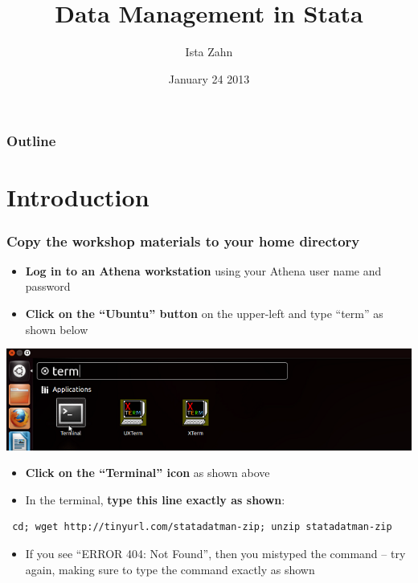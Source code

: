 \documentclass[table]{beamer}
\institute{IQSS}
\title{Data Management in Stata}
\author{Ista Zahn}
\date{January 24 2013}
\begin{document}
\maketitle

\begin{frame}
\frametitle{Outline}
\setcounter{tocdepth}{3}
\tableofcontents
\end{frame}







\section{Introduction}
\label{sec-1}

\begin{frame}[fragile]
\frametitle{Copy the workshop materials to your home directory}
\label{sec-1-1}


\begin{itemize}
\item \textbf{Log in to an Athena workstation} using your Athena user name and password
\item \textbf{Click on the ``Ubuntu'' button} on the upper-left and type ``term'' as shown below
\end{itemize}
\includegraphics[width=.8\textwidth]{./images/OpenTerminal.png}

\begin{itemize}
\item \textbf{Click on the ``Terminal'' icon} as shown above
\item In the terminal, \textbf{type this line exactly as shown}:
\end{itemize}
{\footnotesize
\begin{verbatim}
 cd; wget http://tinyurl.com/statadatman-zip; unzip statadatman-zip
\end{verbatim}
\normalsize}

\begin{itemize}
\item If you see ``ERROR 404: Not Found'', then you mistyped the command -- try again, making sure to type the command exactly as shown
\end{itemize}
\end{frame}
\end{document}
